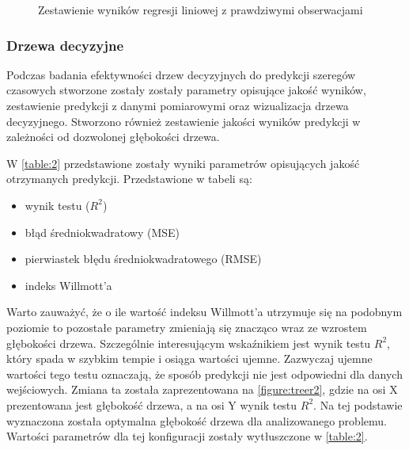 \documentclass[10pt,a4paper]{article}
\begin{document}
\begin{figure}[!ht]
	\centering
	\caption{Zestawienie wyników regresji liniowej z prawdziwymi obserwacjami}
	\label{figure:linear}
\end{figure}
\FloatBarrier
\subsubsection{Drzewa decyzyjne}
\label{subsection:results:tree}
Podczas badania efektywności drzew decyzyjnych do predykcji szeregów czasowych stworzone zostały zostały parametry opisujące jakość wyników, zestawienie predykcji z danymi pomiarowymi oraz wizualizacja drzewa decyzyjnego. Stworzono również zestawienie jakości wyników predykcji w zależności od dozwolonej głębokości drzewa. 

W \autoref{table:2} przedstawione zostały wyniki parametrów opisujących jakość otrzymanych predykcji. Przedstawione w tabeli są:
\begin{center}
	\begin{itemize}
		\item wynik testu ($R^2$)
		\item błąd średniokwadratowy (MSE)
		\item pierwiastek błędu średniokwadratowego (RMSE)
		\item indeks Willmott'a
	\end{itemize}
\end{center}
Warto zauważyć, że o ile wartość indeksu Willmott'a utrzymuje się na podobnym poziomie to pozostałe parametry zmieniają się znacząco wraz ze wzrostem głębokości drzewa. Szczególnie interesującym wskaźnikiem jest wynik testu $R^2$, który spada w szybkim tempie i osiąga wartości ujemne. Zazwyczaj ujemne wartości tego testu oznaczają, że sposób predykcji nie jest odpowiedni dla danych wejściowych. Zmiana ta została zaprezentowana na \autoref{figure:treer2}, gdzie na osi X prezentowana jest głębokość drzewa, a na osi Y wynik testu $R^2$. Na tej podstawie wyznaczona została optymalna głębokość drzewa dla analizowanego problemu. Wartości parametrów dla tej konfiguracji zostały wytłuszczone w \autoref{table:2}.
\end{document}
